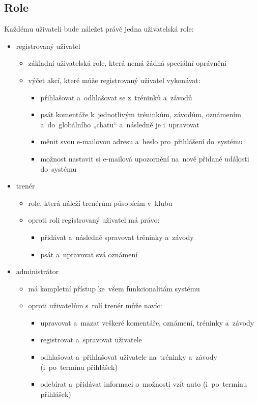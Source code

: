 \subsection{Role}
Každému uživateli bude náležet právě jedna uživatelská role:
\begin{itemize}
	\item registrovaný uživatel
	\begin{itemize}
		\item základní uživatelská role, která nemá žádná speciální oprávnění
		\item výčet akcí, které může registrovaný uživatel vykonávat:
		\begin{itemize}
			\item přihlašovat a~odhlašovat se z~tréninků a~závodů
			\item psát komentáře k~jednotlivým tréninkům, závodům, oznámením a~do~globálního „chatu“ a~následně je i~upravovat
			\item měnit svou e-mailovou adresu a~heslo pro~přihlášení do~systému
			\item možnost nastavit si e-mailová upozornění na~nově přidané události do~systému
		\end{itemize}
	\end{itemize}
	\item trenér
	\begin{itemize}
		\item role, která náleží trenérům působícím v~klubu
		\item oproti roli registrovaný uživatel má právo:
		\begin{itemize}
			\item přidávat a~následně spravovat tréninky a~závody
			\item psát a~upravovat svá oznámení
		\end{itemize}
	\end{itemize}
	\item administrátor
	\begin{itemize}
		\item má kompletní přístup ke~všem funkcionalitám systému
		\item oproti uživatelům s~rolí trenér může navíc:
		\begin{itemize}
			\item upravovat a~mazat veškeré komentáře, oznámení, tréninky a~závody
			\item registrovat a~spravovat uživatele
			\item odhlašovat a~přihlašovat uživatele na~tréninky a~závody (i~po~termínu přihlášek)
			\item odebírat a~přidávat informaci o~možnosti vzít auto (i~po~termínu přihlášek)
		\end{itemize}
	\end{itemize}
\end{itemize}
